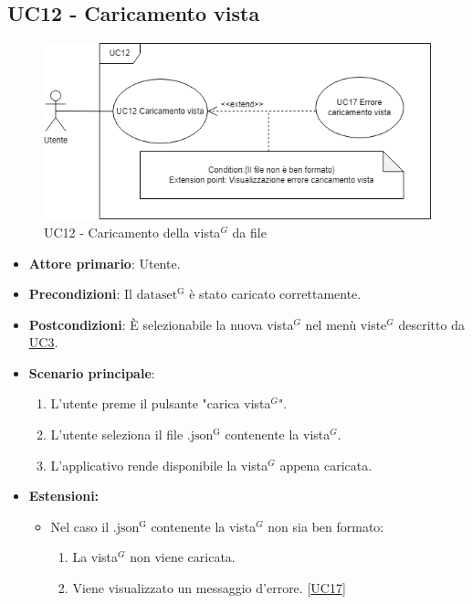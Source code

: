 \subsection{UC12 - Caricamento vista}
\label{sec:UC12}
\begin{figure}[h!]
    \centering
    \includegraphics[scale=0.60]{../../assets/caricamento_vista.png}
    \caption{UC12 - Caricamento della vista$^{G}$ da file}
\end{figure}
\begin{itemize}
    \item \textbf{Attore primario}: Utente.
    \item \textbf{Precondizioni}: Il ${\mathrm{dataset^{G}}}$ è stato caricato correttamente.
    \item \textbf{Postcondizioni}: È selezionabile la nuova vista$^{G}$ nel menù viste$^{G}$ descritto da \hyperref[sec:UC3]{UC3}.
    \item \textbf{Scenario principale}:
          \begin{enumerate}
              \item L'utente preme il pulsante "carica vista$^{G}$".
              \item L'utente seleziona il file ${\mathrm{.json^{G}}}$ contenente la vista$^{G}$.
              \item L'applicativo rende disponibile la vista$^{G}$ appena caricata.
          \end{enumerate}
    \item \textbf{Estensioni:}
    \begin{itemize}
        \item Nel caso il ${\mathrm{.json^{G}}}$ contenente la vista$^{G}$ non sia ben formato: 
        \begin{enumerate}
            \item La vista$^{G}$ non viene caricata.
            \item Viene visualizzato un messaggio d'errore. [\hyperref[sec:UC17 - Errore caricamento vista]{UC17}]
        \end{enumerate}
    \end{itemize}
\end{itemize}

